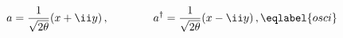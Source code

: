 \begin{equation}
a = \frac 1{\sqrt{2\theta}} (x+\ii y)\,, \qquad\qquad
a^\dagger = \frac 1{\sqrt{2\theta}} (x-\ii y) \,,
\eqlabel{osci}
\end{equation}

